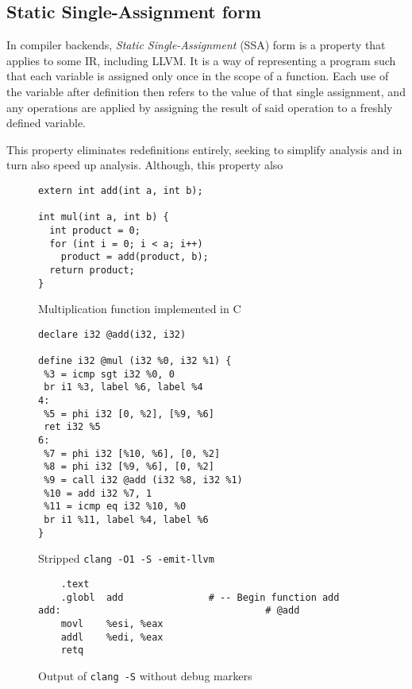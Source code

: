\documentclass{article}
\begin{document}
\subsection{Static Single-Assignment form}
In compiler backends, \textit{Static Single-Assignment} (SSA) form is a property that applies to some IR, including LLVM.
It is a way of representing a program such that each variable is assigned only once in
the scope of a function. Each use of the variable after definition then refers to the value  of that  single assignment, and any operations are applied by assigning the result of said operation to a freshly defined variable.

This property eliminates redefinitions entirely, seeking to simplify analysis and in turn also speed up analysis.
Although, this property also 
\begin{figure}[!ht]
   \begin{minipage}{0.48\textwidth}
     \centering
     \begin{verbatim}
extern int add(int a, int b);

int mul(int a, int b) {
  int product = 0;
  for (int i = 0; i < a; i++)
    product = add(product, b);
  return product;
}
     \end{verbatim}
     \caption{Multiplication function implemented in C}\label{fig:mulc}
   \end{minipage}\hfill
   \begin{minipage}{0.48\textwidth}
     \centering
     \begin{verbatim}
declare i32 @add(i32, i32)

define i32 @mul (i32 %0, i32 %1) {
 %3 = icmp sgt i32 %0, 0
 br i1 %3, label %6, label %4
4:
 %5 = phi i32 [0, %2], [%9, %6]
 ret i32 %5
6:
 %7 = phi i32 [%10, %6], [0, %2]
 %8 = phi i32 [%9, %6], [0, %2]
 %9 = call i32 @add (i32 %8, i32 %1)
 %10 = add i32 %7, 1
 %11 = icmp eq i32 %10, %0
 br i1 %11, label %4, label %6
}
     \end{verbatim}
     \caption{Stripped \texttt{clang -O1 -S -emit-llvm}}\label{fig:mulll}
   \end{minipage}
   \begin{center}
   \begin{minipage}{0.83\textwidth}
     \centering
     \begin{verbatim}
	.text
	.globl	add               # -- Begin function add
add:                                    # @add
	movl	%esi, %eax
	addl	%edi, %eax
	retq
     \end{verbatim}
     \caption{Output of \texttt{clang -S} without debug markers}\label{fig:addx86}
   \end{minipage}
   \end{center}
\end{figure}
\end{document}
